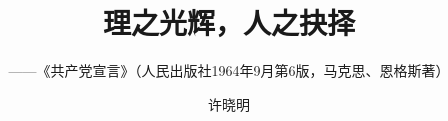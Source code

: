 \documentclass[12pt]{article}%
\title{理之光辉，人之抉择}
\author{——《共产党宣言》（人民出版社1964年9月第6版，马克思、恩格斯著）}
\date{许晓明}
\begin{document}

\renewcommand{\contentsname}{\centering 目录}
\renewcommand{\tablename}{表}
\renewcommand{\figurename}{图}
\renewcommand\refname{参考文献}
\renewcommand\appendix{\setcounter{secnumdepth}{0}}
\renewcommand\abstractname{摘要}



\maketitle
\end{document}
